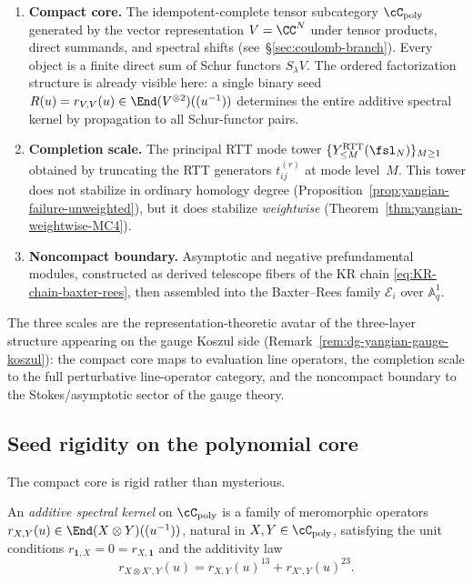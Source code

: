 \begin{enumerate}
 \item \textbf{Compact core.}
 The idempotent-complete tensor subcategory
 $\cC_{\mathrm{poly}}$ generated by the vector representation
 $V = \CC^N$ under tensor products, direct summands, and spectral
 shifts (see~\S\ref{sec:coulomb-branch}).
 Every object is a finite direct sum of Schur functors $S_\lambda V$.
 The ordered factorization structure is already visible here: a
 single binary seed $R(u) = r_{V,V}(u) \in \End(V^{\otimes 2})((u^{-1}))$
 determines the entire additive spectral kernel by propagation
 to all Schur-functor pairs.

 \item \textbf{Completion scale.}
 The principal RTT mode tower
 $\{Y^{\mathrm{RTT}}_{\le M}(\fsl_N)\}_{M \ge 1}$
 obtained by truncating the RTT generators $t^{(r)}_{ij}$ at mode
 level~$M$. This tower does not stabilize in ordinary homology
 degree (Proposition~\ref{prop:yangian-failure-unweighted}), but it
 does stabilize \emph{weightwise}
 (Theorem~\ref{thm:yangian-weightwise-MC4}).

 \item \textbf{Noncompact boundary.}
 Asymptotic and negative prefundamental modules, constructed as
 derived telescope fibers of the KR chain
 \eqref{eq:KR-chain-baxter-rees}, then assembled into the
 Baxter--Rees family $\mathcal{E}_i$ over $\mathbb{A}^1_q$.
\end{enumerate}

\begin{remark}
\label{rem:three-scales-gauge}
The three scales are the representation-theoretic avatar of the
three-layer structure appearing on the gauge Koszul side
(Remark~\ref{rem:dg-yangian-gauge-koszul}): the compact core maps to
evaluation line operators, the completion scale to the full
perturbative line-operator category, and the noncompact boundary to
the Stokes/asymptotic sector of the gauge theory.
\end{remark}

\subsection{Seed rigidity on the polynomial core}

The compact core is rigid rather than mysterious.

\begin{definition}
\label{def:yangian-additive-spectral-kernel}
An \emph{additive spectral kernel} on $\cC_{\mathrm{poly}}$ is a
family of meromorphic operators
$r_{X,Y}(u) \in \End(X \otimes Y)((u^{-1}))$, natural in
$X,Y \in \cC_{\mathrm{poly}}$, satisfying the unit conditions
$r_{\mathbf{1},X} = 0 = r_{X,\mathbf{1}}$ and the additivity law
\begin{equation}\label{eq:yangian-additive-kernel-law}
 r_{X \otimes X',Y}(u) = r_{X,Y}(u)^{13} + r_{X',Y}(u)^{23}.
\end{equation}
\end{definition}

